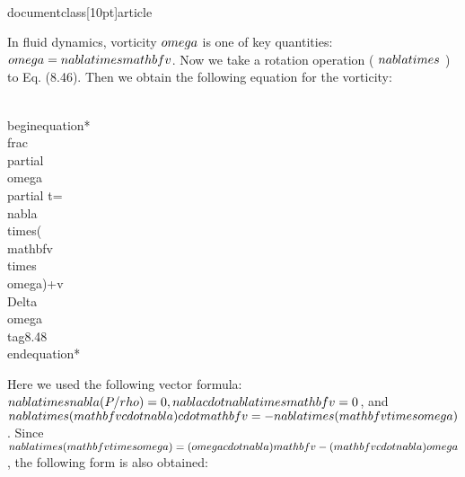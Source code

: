 \\documentclass[10pt]{article}
\begin{document}
{{{{{In fluid dynamics, vorticity $\\omega$ is one of key quantities: $\\omega=\\nabla \\times \\mathbf{v}$. Now we take a rotation operation ( $\\nabla \\times$ ) to Eq. (8.46). Then we obtain the following equation for the vorticity:


\\begin{equation*}
\\frac{\\partial \\omega}{\\partial t}=\\nabla \\times(\\mathbf{v} \\times \\omega)+v \\Delta \\omega \\tag{8.48}
\\end{equation*}


Here we used the following vector formula: $\\nabla \\times \\nabla(P / \\rho)=0, \\nabla \\cdot \\nabla \\times \\mathbf{v}=0$, and $\\nabla \\times\\{(\\mathbf{v} \\cdot \\nabla) \\cdot \\mathbf{v}\\}=-\\nabla \\times(\\mathbf{v} \\times \\omega)$. Since $\\nabla \\times(\\mathbf{v} \\times \\omega)=(\\omega \\cdot \\nabla) \\mathbf{v}-(\\mathbf{v} \\cdot \\nabla) \\omega$, the following form is also obtained:


}}}}}
\end{document}
